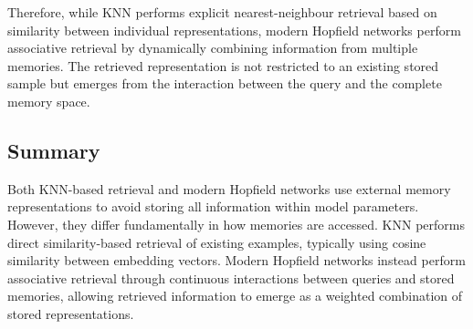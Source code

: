 Therefore, while KNN performs explicit nearest-neighbour retrieval based on similarity between individual representations, modern Hopfield networks perform associative retrieval by dynamically combining information from multiple memories. 
The retrieved representation is not restricted to an existing stored sample but emerges from the interaction between the query and the complete memory space.

\subsection{Summary}

Both KNN-based retrieval and modern Hopfield networks use external memory representations to avoid storing all information within model parameters. 
However, they differ fundamentally in how memories are accessed. 
KNN performs direct similarity-based retrieval of existing examples, typically using cosine similarity between embedding vectors. 
Modern Hopfield networks instead perform associative retrieval through continuous interactions between queries and stored memories, allowing retrieved information to emerge as a weighted combination of stored representations.